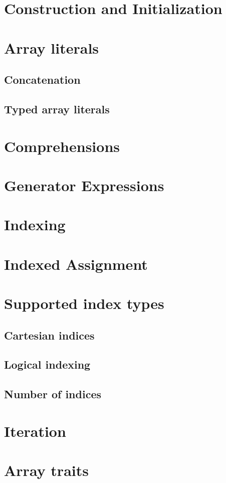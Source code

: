     \section{Construction and Initialization}
    \section{Array literals}
    \subsection{Concatenation}
    \subsection{Typed array literals}
    \section{Comprehensions}
    \section{Generator Expressions}
    \section{Indexing}
    \section{Indexed Assignment}
    \section{Supported index types}
    \subsection{Cartesian indices}
    \subsection{Logical indexing}
    \subsection{Number of indices}
    \section{Iteration}
    \section{Array traits}

